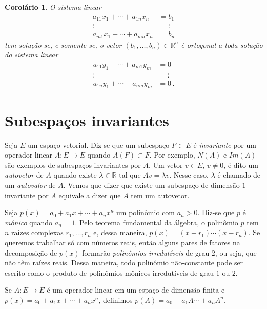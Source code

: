 \documentclass[12pt,a4paper]{article}
\newcommand{\R}{\mathbb{R}}
\newtheorem{cor}[thm]{Corolário}
\theoremstyle{definition}
\begin{document}
\begin{cor}
  O sistema linear
  \begin{equation*}
    \begin{split}
      a_{11}x_1+\cdots+a_{1n}x_n&=b_1\\
      \vdots\qquad\qquad&\quad\,\,\vdots\\
      a_{m1}x_1+\cdots+a_{mn}x_n&=b_n
    \end{split}
  \end{equation*}
  tem solução se, e somente se, o vetor $(b_1,\ldots,b_n)\in\R^n$ é ortogonal a toda solução do sistema linear
  \begin{equation*}
    \begin{split}
      a_{11}y_1+\cdots+a_{m1}y_m&=0\\
      \vdots\qquad\qquad&\quad\,\,\vdots\\
      a_{1n}y_1+\cdots+a_{nm}y_m&=0\,.
    \end{split}
  \end{equation*}
\end{cor}

\section{Subespaços invariantes}

Seja $E$ um espaço vetorial. Diz-se que um subespaço $F\subset E$ é
\textit{invariante} por um operador linear $A:E\to E$ quando
$A(F)\subset F$. Por exemplo, $N(A)$ e $Im(A)$ são exemplos de
subespaços invariantes por $A$. Um vetor $v\in E$, $v\ne 0$, é dito um
\textit{autovetor} de $A$ quando existe $\lambda\in\R$ tal que
$Av=\lambda v$. Nesse caso, $\lambda$ é chamado de um
\textit{autovalor} de $A$. Vemos que dizer que existe um subespaço de
dimensão $1$ invariante por $A$ equivale a dizer que $A$ tem um
autovetor.

Seja $p(x)=a_0+a_1x+\cdots+a_nx^n$ um polinômio com $a_n>0$. Diz-se
que $p$ é \textit{mônico} quando $a_n=1$. Pelo teorema fundamental da
álgebra, o polinômio $p$ tem $n$ raízes complexas $r_1,\ldots,r_n$ e,
dessa maneira, $p(x)=(x-r_1)\cdots(x-r_n)$. Se queremos trabalhar só
com números reais, então alguns pares de fatores na decomposição de
$p(x)$ formarão \textit{polinômios irredutíveis} de grau $2$, ou seja,
que não têm raízes reais. Dessa maneira, todo polinômio não-constante
pode ser escrito como o produto de polinômios mônicos irredutíveis de
grau $1$ ou $2$.

Se $A:E\to E$ é um operador linear em um espaço de dimensão finita e
$p(x)=a_0+a_1x+\cdots+a_nx^n$, definimos $p(A)=a_0+a_1A\cdots+a_nA^n$.
\end{document}
